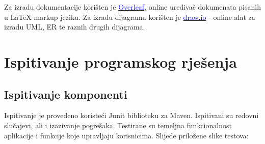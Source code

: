 		\par{	
    		Za izradu dokumentacije korišten je \href{https://www.overleaf.com/}{\textcolor{blue}{Overleaf}}, online uređivač dokumenata pisanih u LaTeX markup jeziku. Za izradu dijagrama korišten je \href{https://app.diagrams.net/}{\textcolor{blue}{draw.io}} - online alat za izradu UML, ER te raznih drugih dijagrama.}
	
	    \eject 
	
		\section{Ispitivanje programskog rješenja}
			
			
			
			
			\subsection{Ispitivanje komponenti}
			
			Ispitivanje je provedeno koristeći Junit biblioteku za Maven. Ispitivani su redovni slučajevi, ali i izazivanje pogrešaka. Testirane su temeljna funkcionalnost aplikacije i funkcije koje upravljaju korisnicima. Slijede priložene slike testova:
			
